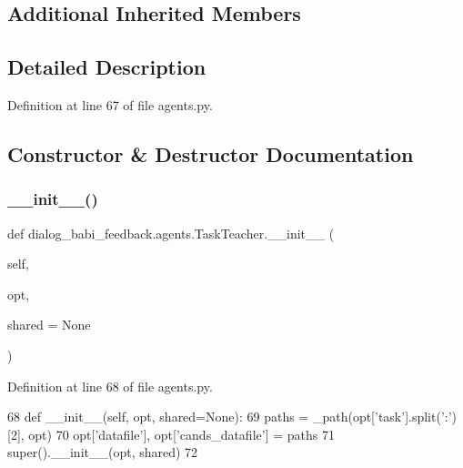 \subsection*{Additional Inherited Members}


\subsection{Detailed Description}


Definition at line 67 of file agents.\+py.



\subsection{Constructor \& Destructor Documentation}
\mbox{\label{classdialog__babi__feedback_1_1agents_1_1TaskTeacher_a6b112b33b1ff89f9c19415a65d4e4387}} 
\subsubsection{\texorpdfstring{\+\_\+\+\_\+init\+\_\+\+\_\+()}{\_\_init\_\_()}}
{\footnotesize\ttfamily def dialog\+\_\+babi\+\_\+feedback.\+agents.\+Task\+Teacher.\+\_\+\+\_\+init\+\_\+\+\_\+ (\begin{DoxyParamCaption}\item[{}]{self,  }\item[{}]{opt,  }\item[{}]{shared = {\ttfamily None} }\end{DoxyParamCaption})}



Definition at line 68 of file agents.\+py.


\begin{DoxyCode}
68     \textcolor{keyword}{def }\_\_init\_\_(self, opt, shared=None):
69         paths = \_path(opt[\textcolor{stringliteral}{'task'}].split(\textcolor{stringliteral}{':'})[2], opt)
70         opt[\textcolor{stringliteral}{'datafile'}], opt[\textcolor{stringliteral}{'cands\_datafile'}] = paths
71         super().\_\_init\_\_(opt, shared)
72 
\end{DoxyCode}



